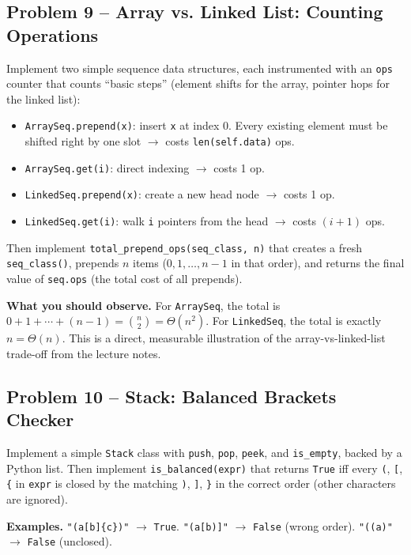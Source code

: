 \documentclass[11pt]{article}
\begin{document}
\subsection*{Problem 9 -- Array vs. Linked List: Counting Operations}

Implement two simple sequence data structures, each instrumented with an \texttt{ops}
counter that counts ``basic steps'' (element shifts for the array, pointer hops for the
linked list):

\begin{itemize}
    \item \texttt{ArraySeq.prepend(x)}: insert \texttt{x} at index 0. Every existing
    element must be shifted right by one slot $\to$ costs \texttt{len(self.data)} ops.
    \item \texttt{ArraySeq.get(i)}: direct indexing $\to$ costs 1 op.
    \item \texttt{LinkedSeq.prepend(x)}: create a new head node $\to$ costs 1 op.
    \item \texttt{LinkedSeq.get(i)}: walk \texttt{i} pointers from the head $\to$ costs
    $(i+1)$ ops.
\end{itemize}

Then implement \texttt{total\_prepend\_ops(seq\_class, n)} that creates a fresh
\texttt{seq\_class()}, prepends $n$ items ($0, 1, \dots, n-1$ in that order), and returns
the final value of \texttt{seq.ops} (the total cost of all prepends).

\textbf{What you should observe.} For \texttt{ArraySeq}, the total is
$0+1+\cdots+(n-1) = \binom{n}{2} = \Theta(n^2)$. For \texttt{LinkedSeq}, the total is
exactly $n = \Theta(n)$. This is a direct, measurable illustration of the array-vs-linked-list
trade-off from the lecture notes.

\subsection*{Problem 10 -- Stack: Balanced Brackets Checker}

Implement a simple \texttt{Stack} class with \texttt{push}, \texttt{pop}, \texttt{peek},
and \texttt{is\_empty}, backed by a Python list. Then implement \texttt{is\_balanced(expr)}
that returns \texttt{True} iff every \texttt{(}, \texttt{[}, \texttt{\{} in \texttt{expr}
is closed by the matching \texttt{)}, \texttt{]}, \texttt{\}} in the correct order (other
characters are ignored).

\textbf{Examples.} \texttt{"(a[b]\{c\})"} $\to$ \texttt{True}. \texttt{"(a[b)]"} $\to$
\texttt{False} (wrong order). \texttt{"((a)"} $\to$ \texttt{False} (unclosed).
\end{document}
